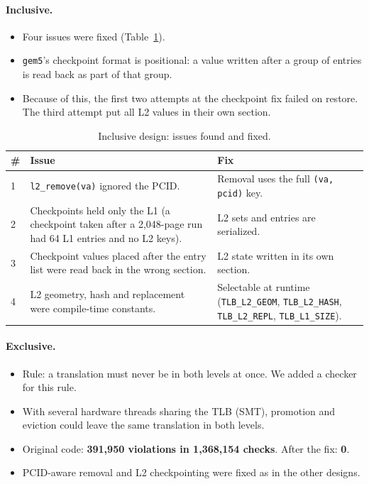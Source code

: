 \paragraph{Inclusive.}
\begin{itemize}
    \item Four issues were fixed (Table~\ref{tab:inc_bugs}).
    \item \texttt{gem5}'s checkpoint format is positional: a value written after a group of entries is read back as part of that group.
    \item Because of this, the first two attempts at the checkpoint fix failed on restore. The third attempt put all L2 values in their own section.
\end{itemize}

\begin{table}[htbp]
\centering
\small
\caption{Inclusive design: issues found and fixed.}
\label{tab:inc_bugs}
\begin{tabularx}{\textwidth}{l X X}
\toprule
\textbf{\#} & \textbf{Issue} & \textbf{Fix} \\
\midrule
1 & \texttt{l2\_remove(va)} ignored the PCID. & Removal uses the full \texttt{(va, pcid)} key. \\
2 & Checkpoints held only the L1 (a checkpoint taken after a 2,048-page run had 64 L1 entries and no L2 keys). & L2 sets and entries are serialized. \\
3 & Checkpoint values placed after the entry list were read back in the wrong section. & L2 state written in its own section. \\
4 & L2 geometry, hash and replacement were compile-time constants. & Selectable at runtime (\texttt{TLB\_L2\_GEOM}, \texttt{TLB\_L2\_HASH}, \texttt{TLB\_L2\_REPL}, \texttt{TLB\_L1\_SIZE}). \\
\bottomrule
\end{tabularx}
\end{table}

\paragraph{Exclusive.}
\begin{itemize}
    \item Rule: a translation must never be in both levels at once. We added a checker for this rule.
    \item With several hardware threads sharing the TLB (SMT), promotion and eviction could leave the same translation in both levels.
    \item Original code: \textbf{391,950 violations in 1,368,154 checks}. After the fix: \textbf{0}.
    \item PCID-aware removal and L2 checkpointing were fixed as in the other designs.
\end{itemize}


